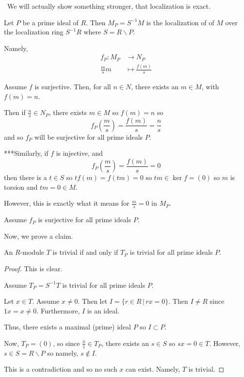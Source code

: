 \documentclass[12pt]{AlgebraQual}
\begin{document}
\begin{solution}$\,$
We will actually show something stronger, that localization is exact.

Let $P$ be a prime ideal of $R$. Then $M_P=S^{-1}M$ is the localization of of $M$ over the localization ring $S^{-1}R$ where $S=R\backslash P$.

Namely, \begin{align*}
    f_P:M_P&\to N_P\\
    \frac{m}{s}m&\mapsto\frac{f(m)}{s}
\end{align*}


\boxed{\implies} Assume $f$ is surjective. Then, for all $n\in N$, there exists an $m\in M$, with $f(m)=n$.

Then if $\frac{n}{s}\in N_P$, there exists $m\in M$ so $f(m)=n$ so $$f_P\left(\frac{m}{s}\right)=\frac{f(m)}{s}=\frac{n}{s}$$ and so $f_P$ will be surjective for all prime ideals $P$.

\begin{mybox}
***Similarly, if $f$ is injective, and $$f_P\left(\frac{m}{s}\right)=\frac{f(m)}{s}=0$$ then there is a $t\in S$ so $tf(m)=f(tm)=0$ so $tm\in\ker f=(0)$ so $m$ is torsion and $tm=0\in M$.

However, this is exactly what it means for $\frac{m}{s}=0$ in $M_P$.
\end{mybox}

\boxed{\impliedby} Assume $f_P$ is surjective for all prime ideals $P$.

Now, we prove a claim.
\begin{claim} An $R$-module $T$ is trivial if and only if $T_P$ is trivial for all prime ideals $P.$
\begin{proof}

\boxed{\implies} This is clear.

\boxed{\impliedby} Assume $T_P=S^{-1}T$ is trivial for all prime ideals $P$.

Let $x\in T$. Assume $x\not=0$. Then let $I=\{r\in R\,|\,rx=0\}.$ Then $I\not=R$ since $1x=x\not=0$. Furthermore, $I$ is an ideal.

Thus, there exists a maximal (prime) ideal $P$ so $I\subset P$.

Now, $T_P=(0)$, so since $\frac{x}{1}\in T_P$, there exists an $s\in S$ so $sx=0\in T$. However, $s\in S=R\backslash P$ so namely, $s\notin I$.

This is a contradiction and so no such $x$ can exist. Namely, $T$ is trivial.
\end{proof}
\end{claim}


\end{solution}
\end{document}
